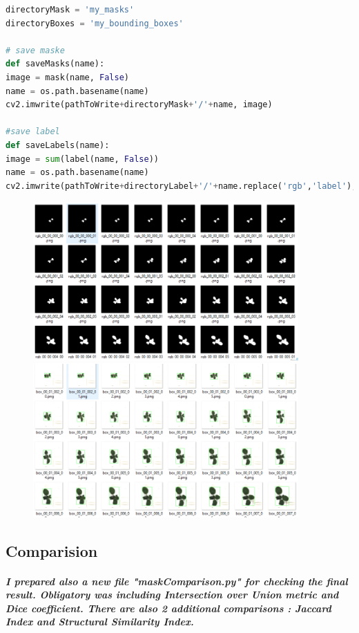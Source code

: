\documentclass[12pt]{article}
\begin{document}
\begin{lstlisting}[language=Python]
directoryMask = 'my_masks'
directoryBoxes = 'my_bounding_boxes'

# save maske
def saveMasks(name):
image = mask(name, False)
name = os.path.basename(name)
cv2.imwrite(pathToWrite+directoryMask+'/'+name, image)

#save label
def saveLabels(name):
image = sum(label(name, False))
name = os.path.basename(name)
cv2.imwrite(pathToWrite+directoryLabel+'/'+name.replace('rgb','label'), image)
\end{lstlisting}


\begin{center}
\begin{figure}[hb!]
\centering
\includegraphics[width = 4in]{directory.png}
\hspace{1cm}
\centering
\includegraphics[width = 4in]{directory1.png}
\end{figure}
\end{center}

\subsection{Comparision}

\subparagraph{
I prepared also a new file "maskComparison.py" for checking the final result. Obligatory was including Intersection over Union metric
and Dice coefficient. There are also 2 additional comparisons : Jaccard Index and Structural Similarity Index.\\\\
}
\end{document}

